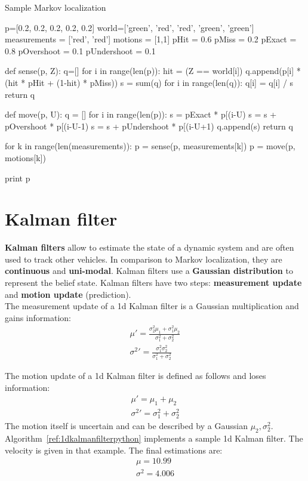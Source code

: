 \documentclass{report}
\begin{document}
\begin{algorithm}
\caption{Sample Markov localization}
\label{ref:markovlocalizationpython}
\begin{python}
p=[0.2, 0.2, 0.2, 0.2, 0.2]
world=['green', 'red', 'red', 'green', 'green']
measurements = ['red', 'red']
motions = [1,1]
pHit = 0.6
pMiss = 0.2
pExact = 0.8
pOvershoot = 0.1
pUndershoot = 0.1

def sense(p, Z):
    q=[]
    for i in range(len(p)):
        hit = (Z == world[i])
        q.append(p[i] * (hit * pHit + (1-hit) * pMiss))
    s = sum(q)
    for i in range(len(q)):
        q[i] = q[i] / s
    return q

def move(p, U):
    q = []
    for i in range(len(p)):
        s = pExact * p[(i-U) %
        s = s + pOvershoot * p[(i-U-1) %
        s = s + pUndershoot * p[(i-U+1) %
        q.append(s)
    return q

for k in range(len(measurements)):
    p = sense(p, measurements[k])
    p = move(p, motions[k])

print p
\end{python}
\end{algorithm}


\section{Kalman filter}
{\bf Kalman filters} allow to estimate the state of a dynamic system and are often used to track other vehicles. In comparison to Markov localization, they are {\bf continuous} and {\bf uni-modal}. Kalman filters use a {\bf Gaussian distribution} to represent the belief state. Kalman filters have two steps: {\bf measurement update} and {\bf motion update} (prediction). \\

The measurement update of a 1d Kalman filter is a Gaussian multiplication and gains information:
\begin{align*}
\mu\prime = \frac{\sigma_2^2\mu_1 + \sigma_1^2\mu_2}{\sigma_1^2 + \sigma_2^2} \\
\sigma^{2}\prime = \frac{\sigma_1^2\sigma_2^2}{\sigma_1^2+\sigma_2^2}
\end{align*}

The motion update of a 1d Kalman filter is defined as follows and loses information:
\begin{align*}
\mu\prime = \mu_1 + \mu_2 \\
\sigma^{2}\prime = \sigma_1^2 + \sigma_2^2
\end{align*}
The motion itself is uncertain and can be described by a Gaussian $\mu_2, \sigma_2^2$. Algorithm~\ref{ref:1dkalmanfilterpython} implements a sample 1d Kalman filter. The velocity is given in that example. The final estimations are:
\begin{align*}
\mu = 10.99 \\
\sigma^2 = 4.006
\end{align*}
\end{document}
